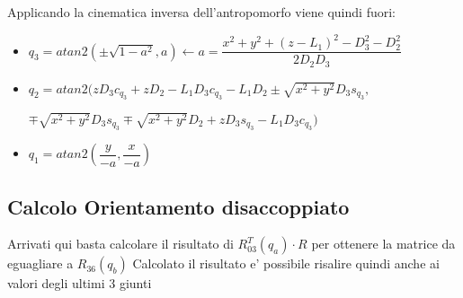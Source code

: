 \documentclass[a4paper,12pt]{article}
\begin{document}
Applicando la cinematica inversa dell'antropomorfo viene quindi fuori:
\begin{itemize}
\item $q_3 = atan2(\pm\sqrt{1-a^2},a) \leftarrow a=\dfrac{x^2+y^2+(z-L_1)^2-D_3^2-D_2^2}{2D_2D_3}$
\item $q_2 = atan2(zD_3c_{q_3} + zD_2 - L_1D_3c_{q_3} - L_1D_2 \pm \sqrt{x^2+y^2}D_3s_{q_3},$

\hspace{20mm} $ \mp \sqrt{x^2+y^2}D_3s_{q_3} \mp \sqrt{x^2+y^2}D_2 + zD_3s_{q_3} - L_1D_3c_{q_3})$
\item $q_1 = atan2(\dfrac{y}{-a},\dfrac{x}{-a})$
\end{itemize}

\subsection{Calcolo Orientamento disaccoppiato}
Arrivati qui basta calcolare il risultato di $ R_{03}^T(q_a) \cdot R $ per ottenere la matrice da eguagliare a $R_{36}(q_b)$
Calcolato il risultato e' possibile risalire quindi anche ai valori degli ultimi 3 giunti
\end{document}
